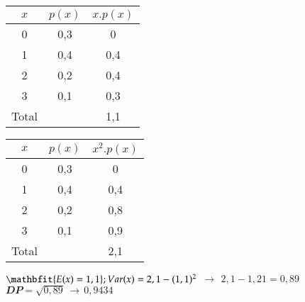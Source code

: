 \begin{enumerate}
\begin{enumerate}[label=\alph*)]
{			\begin{table}[htpb]
				\centering
				{\color{red}
				\begin{tabular}{cc|c|}
					\hline
					\multicolumn{1}{|c|}{$x$}	     & $p(x)$	              	      & $x.p(x)$                   \\ \hline
					\multicolumn{1}{|c|}{0}         & 0,3                          	      & 0                        \\ \hline
					\multicolumn{1}{|c|}{1}         & 0,4                     	      & 0,4                      \\ \hline
					\multicolumn{1}{|c|}{2}         & 0,2                      	      & 0,4                      \\ \hline
					\multicolumn{1}{|c|}{3}         & \multicolumn{1}{c|}{0,1} & \multicolumn{1}{c|}{0,3} \\ \hline
					\multicolumn{1}{|c}{Total}    & \multicolumn{1}{c|}{}       & \multicolumn{1}{c|}{1,1}    \\ \hline
				\end{tabular}
				\hfil
				\begin{tabular}{cc|c|}
					\hline
					\multicolumn{1}{|c|}{$x$}	     & $p(x)$	              	      & $x^{2}.p(x)$                   \\ \hline
					\multicolumn{1}{|c|}{0}         & 0,3                          	      & 0                        \\ \hline
					\multicolumn{1}{|c|}{1}         & 0,4                     	      & 0,4                      \\ \hline
					\multicolumn{1}{|c|}{2}         & 0,2                      	      & 0,8                      \\ \hline
					\multicolumn{1}{|c|}{3}         & \multicolumn{1}{c|}{0,1} & \multicolumn{1}{c|}{0,9} \\ \hline
					\multicolumn{1}{|c}{Total}    & \multicolumn{1}{c|}{}       & \multicolumn{1}{c|}{2,1}    \\ \hline
				\end{tabular}
				}
			\end{table}

			${\mathbfit{E(x) = 1,1}};\\ Var(x) = 2,1 - (1,1)^{2}\ $$\, \to\,$$\ 2,1 - 1,21 = 0,89$	\\
			${\mathbfit{DP = \sqrt{0,89} \, \to\, 0,9434}}$	
		}
		
	\end{enumerate}


\end{enumerate}

